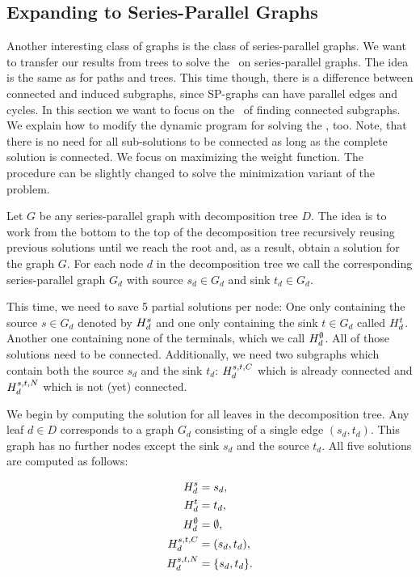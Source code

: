 \subsection{Expanding to Series-Parallel Graphs}
\label{sec:dynamicprog:spg}

Another interesting class of graphs is the class of series-parallel graphs. We want to transfer our results from trees to solve the \WSP\ on series-parallel graphs. The idea is the same as for paths and trees. This time though, there is a difference between connected and induced subgraphs, since SP-graphs can have parallel edges and cycles. In this section we want to focus on the \WSP\ of finding connected subgraphs. We explain how to modify the dynamic program for solving the \WISP, too. Note, that there is no need for all sub-solutions to be connected as long as the complete solution is connected. We focus on maximizing the weight function. The procedure can be slightly changed to solve the minimization variant of the problem.\medskip

Let $G$ be any series-parallel graph with decomposition tree $D$. The idea is to work from the bottom to the top of the decomposition tree recursively reusing previous solutions until we reach the root and, as a result, obtain a solution for the graph $G$. For each node $d$ in the decomposition tree we call the corresponding series-parallel graph $G_d$ with source $s_d\in G_d$ and sink $t_d\in G_d$.\medskip

This time, we need to save 5 partial solutions per node: One only containing the source $s\in G_d$ denoted by $H_{d}^{s}$ and one only containing the sink $t\in G_d$ called $H_{d}^{t}$. Another one containing none of the terminals, which we call $H_{d}^{\emptyset}$. All of those solutions need to be connected. Additionally, we need two subgraphs which contain both the source $s_d$ and the sink $t_d$: $H_{d}^{s,t,C}$ which is already connected and $H_{d}^{s,t,N}$ which is not (yet) connected.\medskip

We begin by computing the solution for all leaves in the decomposition tree. Any leaf $d \in D$ corresponds to a graph $G_d$ consisting of a single edge $(s_d, t_d)$. This graph has no further nodes except the sink $s_d$ and the source $t_d$. All five solutions are computed as follows:

\begin{align}
	\label{equ:spinint}
	\begin{split}
		H_{d}^{s} &= s_d,\\
		H_{d}^{t} &= t_d,\\
		H_{d}^{\emptyset} &= \emptyset,\\
		H_{d}^{s,t,C} &= (s_d,t_d),\\
		H_{d}^{s,t,N} &= \{ s_d, t_d \}.
	\end{split}
\end{align}

